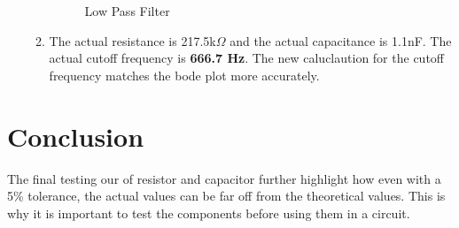 \documentclass{article}
\begin{document}
\begin{enumerate}
\begin{enumerate}
\begin{figure}[H]
            \caption{Low Pass Filter}
            \label{fig:filter}
        \end{figure}
        \item The actual resistance is 217.5k$\Omega$ and the actual capacitance is 1.1nF. The actual cutoff frequency is \textbf{666.7 Hz}. The new caluclaution for the cutoff frequency matches the bode plot more accurately.
       \end{enumerate}
    \end{enumerate}


\section*{Conclusion}
The final testing our of resistor and capacitor further highlight how even with a 5\% tolerance, the actual values can be far off from the theoretical values. This is why it is important to test the components before using them in a circuit.
\end{document}
